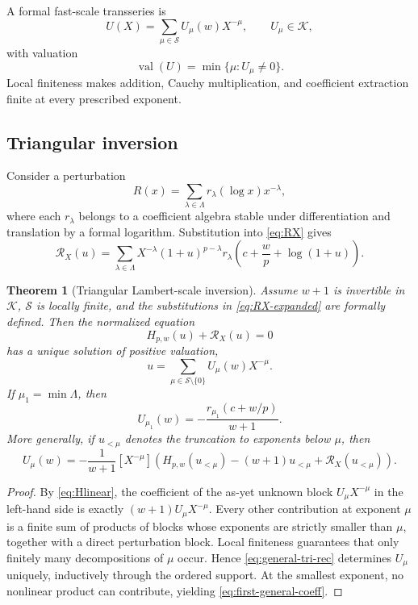 \documentclass[11pt]{article}
\newtheorem{theorem}{Theorem}[section]
\theoremstyle{definition}
\theoremstyle{remark}
\newcommand{\calS}{\mathcal S}
\newcommand{\calK}{\mathcal K}
\DeclareMathOperator{\val}{val}
\begin{document}
A formal fast-scale transseries is
\[
 U(X)=\sum_{\mu\in\calS}U_\mu(w)X^{-\mu},
 \qquad U_\mu\in\calK,
\]
with valuation
\[
 \val(U)=\min\{\mu:U_\mu\ne0\}.
\]
Local finiteness makes addition, Cauchy multiplication, and coefficient extraction finite at every prescribed exponent.

\subsection{Triangular inversion}

Consider a perturbation
\begin{equation}\label{eq:R-hahn}
 R(x)=\sum_{\lambda\in\Lambda}
 r_\lambda(\log x)x^{-\lambda},
\end{equation}
where each \(r_\lambda\) belongs to a coefficient algebra stable under differentiation and translation by a formal logarithm.  Substitution into \cref{eq:RX} gives
\begin{equation}\label{eq:RX-expanded}
 \mathscr R_X(u)=
 \sum_{\lambda\in\Lambda}X^{-\lambda}
 (1+u)^{p-\lambda}
 r_\lambda\!\left(c+\frac{w}{p}+\log(1+u)\right).
\end{equation}

\begin{theorem}[Triangular Lambert-scale inversion]\label{thm:triangular-general}
Assume \(w+1\) is invertible in \(\calK\), \(\calS\) is locally finite, and the substitutions in \cref{eq:RX-expanded} are formally defined.  Then the normalized equation
\[
 H_{p,w}(u)+\mathscr R_X(u)=0
\]
has a unique solution of positive valuation,
\begin{equation}\label{eq:u-hahn}
 u=\sum_{\mu\in\calS\setminus\{0\}}U_\mu(w)X^{-\mu}.
\end{equation}
If \(\mu_1=\min\Lambda\), then
\begin{equation}\label{eq:first-general-coeff}
 U_{\mu_1}(w)
 =-\frac{r_{\mu_1}(c+w/p)}{w+1}.
\end{equation}
More generally, if \(u_{<\mu}\) denotes the truncation to exponents below \(\mu\), then
\begin{equation}\label{eq:general-tri-rec}
 U_\mu(w)
 =-\frac{1}{w+1}
 [X^{-\mu}]
 \left(
 H_{p,w}(u_{<\mu})-(w+1)u_{<\mu}
 +\mathscr R_X(u_{<\mu})
 \right).
\end{equation}
\end{theorem}

\begin{proof}
By \cref{eq:Hlinear}, the coefficient of the as-yet unknown block
\(U_\mu X^{-\mu}\) in the left-hand side is exactly
\((w+1)U_\mu X^{-\mu}\).  Every other contribution at exponent \(\mu\) is a finite sum of products of blocks whose exponents are strictly smaller than \(\mu\), together with a direct perturbation block.  Local finiteness guarantees that only finitely many decompositions of \(\mu\) occur.  Hence \cref{eq:general-tri-rec} determines \(U_\mu\) uniquely, inductively through the ordered support.  At the smallest exponent, no nonlinear product can contribute, yielding \cref{eq:first-general-coeff}.
\end{proof}
\end{document}
